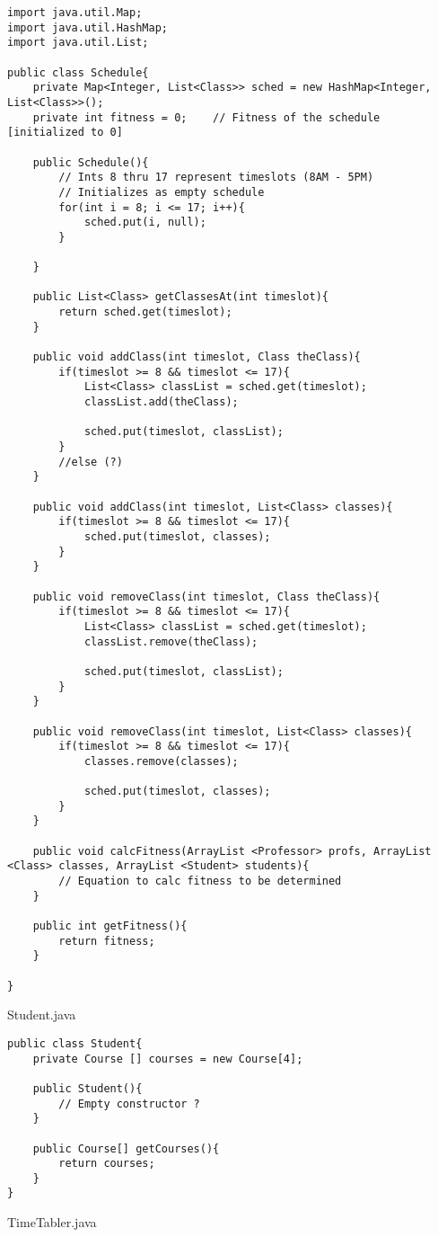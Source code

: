 \documentclass{article}
\begin{document}
\begin{lstlisting}
import java.util.Map;
import java.util.HashMap;
import java.util.List;

public class Schedule{
	private Map<Integer, List<Class>> sched = new HashMap<Integer, List<Class>>();
	private int fitness = 0;	// Fitness of the schedule [initialized to 0]

	public Schedule(){
		// Ints 8 thru 17 represent timeslots (8AM - 5PM)
		// Initializes as empty schedule
		for(int i = 8; i <= 17; i++){
			sched.put(i, null);
		}

	}

	public List<Class> getClassesAt(int timeslot){
		return sched.get(timeslot);
	}

	public void addClass(int timeslot, Class theClass){
		if(timeslot >= 8 && timeslot <= 17){
			List<Class> classList = sched.get(timeslot);
			classList.add(theClass);
			
			sched.put(timeslot, classList);
		}
		//else (?)
	}

	public void addClass(int timeslot, List<Class> classes){
		if(timeslot >= 8 && timeslot <= 17){
			sched.put(timeslot, classes);
		}
	}

	public void removeClass(int timeslot, Class theClass){
		if(timeslot >= 8 && timeslot <= 17){
			List<Class> classList = sched.get(timeslot);
			classList.remove(theClass);

			sched.put(timeslot, classList);
		}
	}

	public void removeClass(int timeslot, List<Class> classes){
		if(timeslot >= 8 && timeslot <= 17){
			classes.remove(classes);

			sched.put(timeslot, classes);
		}
	}

	public void calcFitness(ArrayList <Professor> profs, ArrayList <Class> classes, ArrayList <Student> students){
		// Equation to calc fitness to be determined
	}

	public int getFitness(){
		return fitness;
	}

}
\end{lstlisting}
Student.java
\begin{lstlisting}
public class Student{
	private Course [] courses = new Course[4];

	public Student(){
		// Empty constructor ?
	}

	public Course[] getCourses(){
		return courses;
	}
}
\end{lstlisting}
TimeTabler.java
\end{document}
